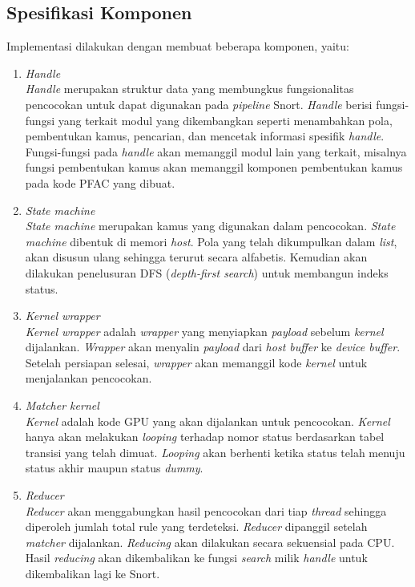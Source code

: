   \subsection{Spesifikasi Komponen}

    Implementasi dilakukan dengan membuat beberapa komponen, yaitu:

    \begin{enumerate}

      \item
      \emph{Handle} \\
      \emph{Handle} merupakan struktur data yang membungkus fungsionalitas pencocokan untuk dapat digunakan pada \emph{pipeline} Snort. \emph{Handle} berisi fungsi-fungsi yang terkait modul yang dikembangkan seperti menambahkan pola, pembentukan kamus, pencarian, dan mencetak informasi spesifik \emph{handle}. Fungsi-fungsi pada \emph{handle} akan memanggil modul lain yang terkait, misalnya fungsi pembentukan kamus akan memanggil komponen pembentukan kamus pada kode PFAC yang dibuat.

      \item
      \emph{State machine} \\
      \emph{State machine} merupakan kamus yang digunakan dalam pencocokan. \emph{State machine} dibentuk di memori \emph{host}. Pola yang telah dikumpulkan dalam \emph{list}, akan disusun ulang sehingga terurut secara alfabetis. Kemudian akan dilakukan penelusuran DFS (\emph{depth-first search}) untuk membangun indeks status.

      \item
      \emph{Kernel wrapper} \\
      \emph{Kernel wrapper} adalah \emph{wrapper} yang menyiapkan \emph{payload} sebelum \emph{kernel} dijalankan. \emph{Wrapper} akan menyalin \emph{payload} dari \emph{host buffer} ke \emph{device buffer}. Setelah persiapan selesai, \emph{wrapper} akan memanggil kode \emph{kernel} untuk menjalankan pencocokan.\clearpage
      
      \item
      \emph{Matcher kernel} \\
      \emph{Kernel} adalah kode GPU yang akan dijalankan untuk pencocokan. \emph{Kernel} hanya akan melakukan \emph{looping} terhadap nomor status berdasarkan tabel transisi yang telah dimuat. \emph{Looping} akan berhenti ketika status telah menuju status akhir maupun status \emph{dummy}.

      \item
      \emph{Reducer} \\
      \emph{Reducer} akan menggabungkan hasil pencocokan dari tiap \emph{thread} sehingga diperoleh jumlah total rule yang terdeteksi. \emph{Reducer} dipanggil setelah \emph{matcher} dijalankan. \emph{Reducing} akan dilakukan secara sekuensial pada CPU. Hasil \emph{reducing} akan dikembalikan ke fungsi \emph{search} milik \emph{handle} untuk dikembalikan lagi ke Snort.
      
    \end{enumerate}

